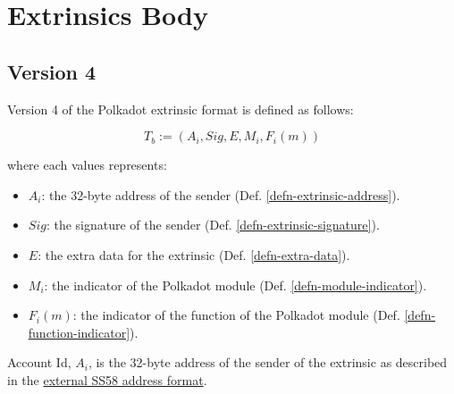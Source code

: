 \section{Extrinsics Body}

\subsection{Version 4}
\label{sect-version-four}

Version 4 of the Polkadot extrinsic format is defined as follows:

\[
    T_b := (A_i, Sig, E, M_i, F_i(m))
\]

where each values represents:
\begin{itemize}
    \item $A_i$: the 32-byte address of the sender (Def. \ref{defn-extrinsic-address}).
    \item $Sig$: the signature of the sender (Def. \ref{defn-extrinsic-signature}).
    \item $E$: the extra data for the extrinsic (Def. \ref{defn-extra-data}).
    \item $M_i$: the indicator of the Polkadot module (Def. \ref{defn-module-indicator}).
    \item $F_i(m)$: the indicator of the function of the Polkadot module (Def. \ref{defn-function-indicator}).
\end{itemize}

\begin{definition}
    \label{defn-extrinsic-address}
    Account Id, $A_i$, is the 32-byte address of the sender of the extrinsic as
    described in the
    \href{https://github.com/paritytech/substrate/wiki/External-Address-Format-(SS58)}{external
    SS58 address format}.
\end{definition}

